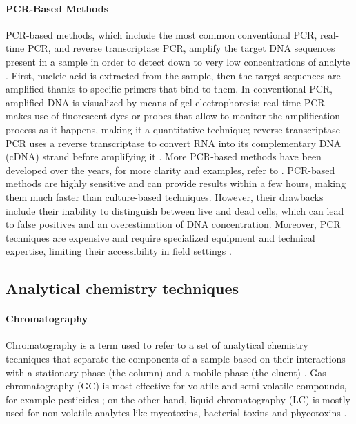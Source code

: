 \paragraph{PCR-Based Methods}
PCR-based methods, which include the most common conventional PCR, real-time
PCR, and reverse transcriptase PCR, amplify the target DNA sequences present in
a sample in order to detect down to very low concentrations of analyte
\citep{salazarPolymerase2015}. First, nucleic acid is extracted from the sample,
then the target sequences are amplified thanks to specific primers that bind to
them. In conventional PCR, amplified DNA is visualized by means of gel
electrophoresis; real-time PCR makes use of fluorescent dyes or probes that
allow to monitor the amplification process as it happens, making it a
quantitative technique; reverse-transcriptase PCR uses a reverse transcriptase
to convert RNA into its complementary DNA (cDNA) strand before amplifying it
\citep{liLuminescent2020}. More PCR-based methods have been developed over the
years, for more clarity and examples, refer to \citet{singhCritical2014}.
PCR-based methods are highly sensitive and can provide results within a few
hours, making them much faster than culture-based techniques. However, their
drawbacks include their inability to distinguish between live and dead cells,
which can lead to false positives and an overestimation of DNA concentration.
Moreover, PCR techniques are expensive and require specialized equipment and
technical expertise, limiting their accessibility in field settings
\citep{velusamyOverview2010,kabirazConventional2023}.

\subsection{Analytical chemistry techniques}
\label{sec:chemistry_detection}

\paragraph{Chromatography}
Chromatography is a term used to refer to a set of analytical chemistry
techniques that separate the components of a sample based on their interactions
with a stationary phase (the column) and a mobile phase (the eluent)
\citep{malikLiquid2010,zhangRapid2021}. Gas chromatography (GC) is most
effective for volatile and semi-volatile compounds, for example pesticides
\citep{walorczykPesticide2016, nolvachaiMultidimensional2017, fengGas2019}; on
the other hand, liquid chromatography (LC) is mostly used for non-volatile
analytes like mycotoxins, bacterial toxins and phycotoxins
\citep{yamatodaniHighperformance1985,nieHighperformance2019,fedorenkoRecent2023,quintanilla-villanuevaRecent2024}.

